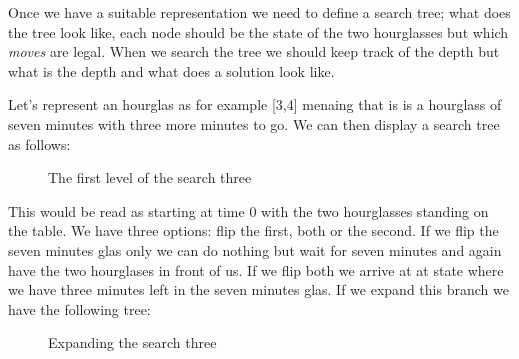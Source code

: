 \documentclass[a4paper,11pt]{article}
\begin{document}
Once we have a suitable representation we need to define a search
tree; what does the tree look like, each node should be the state of
the two hourglasses but which {\em moves} are legal. When we search
the tree we should keep track of the depth but what is the depth and
what does a solution look like.

Let's represent an hourglas as for example [3,4] menaing that is is a
hourglass of seven minutes with three more minutes to go. We can then
display a search tree as follows:

\begin{figure}[h]
\center
{}
\caption{The first level of the search three}
\end{figure}

This would be read as starting at time $0$ with the two hourglasses
standing on the table. We have three options: flip the first, both or
the second. If we flip the seven minutes glas only we can do nothing
but wait for seven minutes and again have the two hourglases in front
of us. If we flip both we arrive at at state where we have three
minutes left in the seven minutes glas. If we expand this branch we
have the following tree:


\begin{figure}[h]
\center
{}
\caption{Expanding the search three}
\end{figure}
\end{document}
